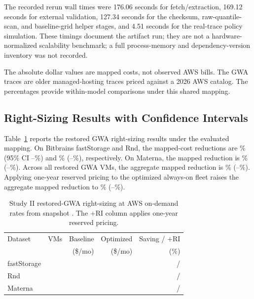 \documentclass[11pt]{article}
\begin{document}
The recorded rerun wall times were 176.06 seconds for fetch/extraction,
169.12 seconds for external validation, 127.34 seconds for the checksum,
raw-quantile-scan, and baseline-grid helper stages, and 4.51 seconds for the
real-trace policy simulation. These timings document the artifact run; they
are not a hardware-normalized scalability benchmark; a full
process-memory and dependency-version inventory was not recorded.

The absolute dollar values are mapped costs, not observed AWS bills. The GWA
traces are older managed-hosting traces priced against a 2026 AWS catalog.
The percentages provide within-model comparisons under this shared mapping.

\subsection{Right-Sizing Results with Confidence Intervals}

Table~\ref{tab:external} reports the restored GWA right-sizing results under
the evaluated mapping. On Bitbrains fastStorage and Rnd, the mapped-cost
reductions are \extFsSavingsPct\% (95\% CI
\extFsSavingsCiLow--\extFsSavingsCiHigh\%) and \extRndSavingsPct\%
(\extRndSavingsCiLow--\extRndSavingsCiHigh\%), respectively. On Materna, the
mapped reduction is \extMatSavingsPct\%
(\extMatSavingsCiLow--\extMatSavingsCiHigh\%). Across all restored GWA VMs,
the aggregate mapped reduction is \extOverallSavingsPct\%
(\extOverallSavingsCiLow--\extOverallSavingsCiHigh\%). Applying one-year
reserved pricing to the optimized always-on fleet raises the aggregate mapped
reduction to \extOverallSavingsPctRi\%
(\extOverallSavingsPctRiCiLow--\extOverallSavingsPctRiCiHigh\%).

\begin{table}[t]
\caption{Study II restored-GWA right-sizing at AWS on-demand rates from
snapshot \extSnapshot. The $+$RI column applies one-year reserved pricing.}
\label{tab:external}
\centering
\renewcommand{\arraystretch}{1.08}
\setlength{\tabcolsep}{3.5pt}
\begin{tabular}{@{}l r r r r@{}}
\toprule
Dataset & VMs & Baseline & Optimized & Saving / $+$RI \\
 & & (\$/mo) & (\$/mo) & (\%) \\
\midrule
fastStorage & \extFsVms{} & \extFsBaseline{} & \extFsOptimized{} & \extFsSavingsPct{} / \extFsSavingsPctRi{} \\
Rnd & \extRndVms{} & \extRndBaseline{} & \extRndOptimized{} & \extRndSavingsPct{} / \extRndSavingsPctRi{} \\
Materna & \extMatVms{} & \extMatBaseline{} & \extMatOptimized{} & \extMatSavingsPct{} / \extMatSavingsPctRi{} \\
\bottomrule
\end{tabular}
\end{table}
\end{document}
